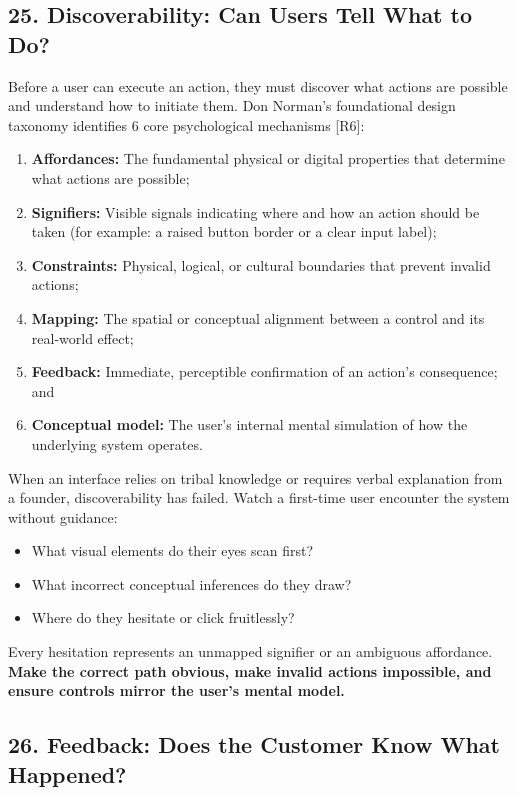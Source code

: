 \subsection*{25. Discoverability: Can Users Tell What to Do?}

Before a user can execute an action, they must discover what actions are possible and understand how to initiate them. Don Norman's foundational design taxonomy identifies 6 core psychological mechanisms [R6]:
\begin{enumerate}
    \item \textbf{Affordances:} The fundamental physical or digital properties that determine what actions are possible;
    \item \textbf{Signifiers:} Visible signals indicating where and how an action should be taken (for example: a raised button border or a clear input label);
    \item \textbf{Constraints:} Physical, logical, or cultural boundaries that prevent invalid actions;
    \item \textbf{Mapping:} The spatial or conceptual alignment between a control and its real-world effect;
    \item \textbf{Feedback:} Immediate, perceptible confirmation of an action's consequence; and
    \item \textbf{Conceptual model:} The user's internal mental simulation of how the underlying system operates.
\end{enumerate}

When an interface relies on tribal knowledge or requires verbal explanation from a founder, discoverability has failed. Watch a first-time user encounter the system without guidance:
\begin{itemize}
    \item What visual elements do their eyes scan first?
    \item What incorrect conceptual inferences do they draw?
    \item Where do they hesitate or click fruitlessly?
\end{itemize}

Every hesitation represents an unmapped signifier or an ambiguous affordance. \textbf{Make the correct path obvious, make invalid actions impossible, and ensure controls mirror the user's mental model.}

\subsection*{26. Feedback: Does the Customer Know What Happened?}

